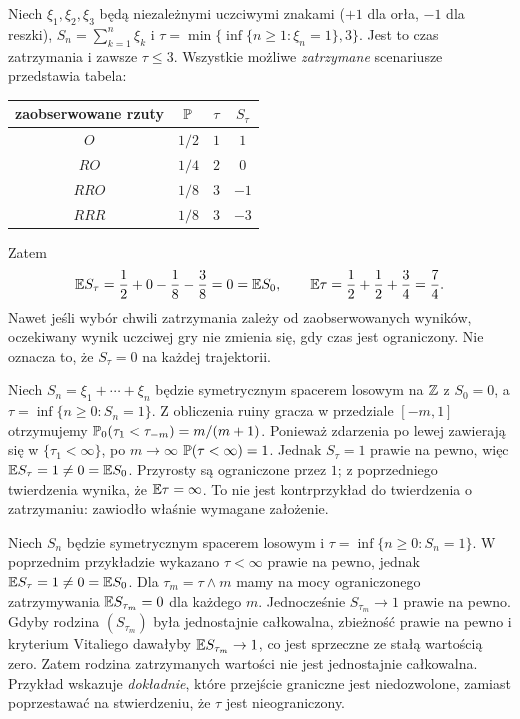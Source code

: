 \begin{przyklad}
Niech $\xi_1,\xi_2,\xi_3$ będą niezależnymi uczciwymi
znakami ($+1$ dla orła, $-1$ dla reszki),
$S_n=\sum_{k=1}^n\xi_k$ i
$\tau=\min\{\inf\{n\geq1:\xi_n=1\},3\}$.
Jest to czas zatrzymania i zawsze $\tau\leq3$.
Wszystkie możliwe \emph{zatrzymane} scenariusze
przedstawia tabela:
\begin{center}
\begin{tabular}{c|c|c|c}
zaobserwowane rzuty & $\mathbb{P}$ & $\tau$ & $S_\tau$\\\hline
$O$ & $1/2$ & $1$ & $1$\\
$RO$ & $1/4$ & $2$ & $0$\\
$RRO$ & $1/8$ & $3$ & $-1$\\
$RRR$ & $1/8$ & $3$ & $-3$
\end{tabular}
\end{center}
Zatem
\[
\mathbb{E} S_\tau=\frac12+0-\frac18-\frac38=0
=\mathbb{E} S_0,\qquad
\mathbb{E}\tau=\frac12+\frac12+\frac34=\frac74.
\]
Nawet jeśli wybór chwili zatrzymania zależy od
zaobserwowanych wyników, oczekiwany wynik uczciwej
gry nie zmienia się, gdy czas jest ograniczony.
Nie oznacza to, że $S_\tau=0$ na każdej trajektorii.
\end{przyklad}

\begin{przyklad}
Niech $S_n=\xi_1+\cdots+\xi_n$ będzie symetrycznym
spacerem losowym na $\mathbb{Z}$ z $S_0=0$,
a $\tau=\inf\{n\geq0:S_n=1\}$.
Z obliczenia ruiny gracza w przedziale
$[-m,1]$ otrzymujemy
$\mathbb{P}_0(\tau_1<\tau_{-m})=m/(m+1)$.
Ponieważ zdarzenia po lewej zawierają się
w $\{\tau_1<\infty\}$, po $m\to\infty$
$\mathbb{P}(\tau<\infty)=1$. Jednak $S_\tau=1$
prawie na pewno, więc $\mathbb{E} S_\tau=1\ne0=\mathbb{E} S_0$.
Przyrosty są ograniczone przez $1$;
z poprzedniego twierdzenia wynika, że
$\mathbb{E}\tau=\infty$. To nie jest kontrprzykład
do twierdzenia o zatrzymaniu: zawiodło
właśnie wymagane założenie.
\end{przyklad}



\begin{uwaga}
Niech $S_n$ będzie symetrycznym spacerem losowym i
$\tau=\inf\{n\geq0:S_n=1\}$. W poprzednim przykładzie
wykazano $\tau<\infty$ prawie na pewno, jednak
$\mathbb{E} S_\tau=1\ne0=\mathbb{E} S_0$. Dla
$\tau_m=\tau\wedge m$ mamy na mocy ograniczonego
zatrzymywania $\mathbb{E} S_{\tau_m}=0$ dla każdego $m$.
Jednocześnie $S_{\tau_m}\to1$ prawie na pewno.
Gdyby rodzina $(S_{\tau_m})$ była jednostajnie
całkowalna, zbieżność prawie na pewno i kryterium
Vitaliego dawałyby $\mathbb{E} S_{\tau_m}\to1$, co jest
sprzeczne ze stałą wartością zero.
Zatem rodzina zatrzymanych wartości nie jest
jednostajnie całkowalna. Przykład wskazuje
\emph{dokładnie}, które przejście graniczne jest
niedozwolone, zamiast poprzestawać na stwierdzeniu,
że $\tau$ jest nieograniczony.
\end{uwaga}

